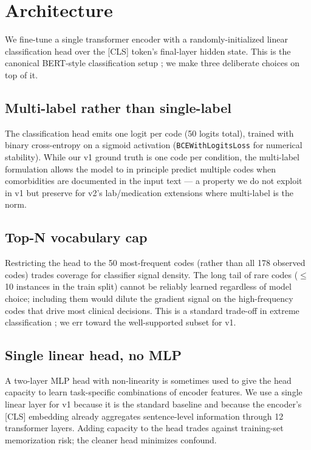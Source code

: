\section{Architecture}\label{architecture}

We fine-tune a single transformer encoder with a randomly-initialized
linear classification head over the {[}CLS{]} token's final-layer
hidden state. This is the canonical BERT-style classification setup
\autocite{Devlin2019}; we make three deliberate choices on top of it.

\subsection{Multi-label rather than single-label}\label{multi-label-rather-than-single-label}

The classification head emits one logit per code (50 logits total),
trained with binary cross-entropy on a sigmoid activation
(\texttt{BCEWithLogitsLoss} for numerical stability). While our v1 ground
truth is one code per condition, the multi-label formulation allows
the model to in principle predict multiple codes when comorbidities
are documented in the input text --- a property we do not exploit in
v1 but preserve for v2's lab/medication extensions where multi-label
is the norm.

\subsection{Top-N vocabulary cap}\label{top-n-vocabulary-cap}

Restricting the head to the 50 most-frequent codes (rather than all
178 observed codes) trades coverage for classifier signal density.
The long tail of rare codes ($\leq$10 instances in the train split)
cannot be reliably learned regardless of model choice; including
them would dilute the gradient signal on the high-frequency codes
that drive most clinical decisions. This is a standard trade-off in
extreme classification \autocite{Chalkidis2020}; we err toward the
well-supported subset for v1.

\subsection{Single linear head, no MLP}\label{single-linear-head-no-mlp}

A two-layer MLP head with non-linearity is sometimes used to give
the head capacity to learn task-specific combinations of encoder
features. We use a single linear layer for v1 because it is the
standard baseline and because the encoder's {[}CLS{]} embedding already
aggregates sentence-level information through 12 transformer
layers. Adding capacity to the head trades against training-set
memorization risk; the cleaner head minimizes confound.

